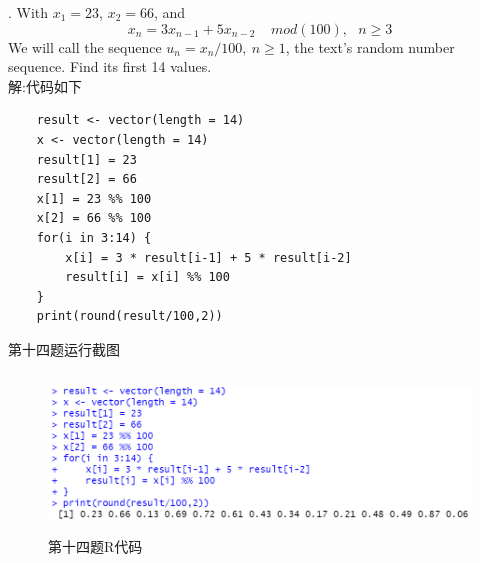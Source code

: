 \documentclass{book}
\begin{document}
. With $x_{1} = 23$, $x_{2} = 66$, and \\
$$
    x_{n} = 3x_{n-1} + 5x_{n-2} \ \ \ \ \ mod(100), \ \ \ n \geq 3
$$
We will call the sequence $u_{n} = x_{n}/100, \ n \geq 1$,
the text's random number sequence. Find its first 14 values. \\
解:代码如下
\lstset{language = R}
\begin{lstlisting}
    result <- vector(length = 14)
    x <- vector(length = 14)
    result[1] = 23
    result[2] = 66
    x[1] = 23 %% 100
    x[2] = 66 %% 100
    for(i in 3:14) {
        x[i] = 3 * result[i-1] + 5 * result[i-2]	
        result[i] = x[i] %% 100
    }
    print(round(result/100,2))
\end{lstlisting}
第十四题运行截图
\begin{figure}[H]
    \centering
    \includegraphics*[height = 4.2cm, width = 12cm]{gramFile/第十四题运行截图.PNG}
    \caption{第十四题R代码} 
\end{figure}   
 
\end{document}
